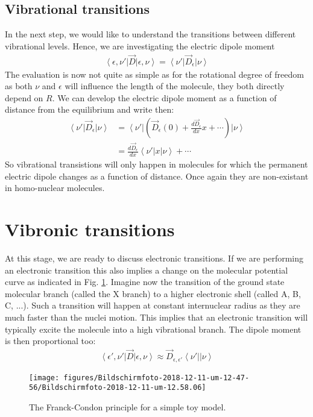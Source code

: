 \documentclass[10pt]{article}
\newcommand{\bra}[1]{\ensuremath{\left\langle#1\right|}}
\newcommand{\ket}[1]{\ensuremath{\left|#1\right\rangle}}
\begin{document}
\subsection{Vibrational transitions}
In the next step, we would like to understand the transitions between different vibrational levels. Hence, we are investigating the electric dipole moment 
\begin{align}
\bra{\epsilon, \nu'} \vec{D}\ket{\epsilon, \nu}= \bra{\nu'} \vec{D}_\epsilon\ket{\nu}
\end{align}
The evaluation is now not quite as simple as for the rotational degree of freedom as both $\nu$ and $\epsilon$ will influence the length of the molecule, they both directly depend on $R$. We can develop the electric dipole moment as a function of distance from the equilibrium and write then:
\begin{align}
\bra{\nu'} \vec{D}_\epsilon\ket{\nu}&= \bra{\nu'} \left(\vec{D}_\epsilon(0)+ \frac{d\vec{D}_\epsilon}{dx}x+\cdots\right)\ket{\nu}\\
&= \frac{d\vec{D}_\epsilon}{dx}\bra{\nu'}x\ket{\nu}+\cdots
\end{align}
So vibrational transistions will only happen in molecules for which the permanent electric dipole changes as a function of distance. Once again they are non-existant in homo-nuclear molecules.

\section{Vibronic transitions}

At this stage, we are ready to discuss electronic transitions. If we are performing an electronic transition this also implies a change on the molecular potential curve as indicated in Fig. \ref{121419}. Imagine now the transition of the ground state molecular branch (called the X branch) to a higher electronic shell (called A, B, C, ...). Such a transition will happen at constant internuclear radius as they are much faster than the nuclei motion. This implies that an electronic transition will typically excite the molecule into a high vibrational branch. The dipole moment is then proportional too:
\begin{align}
\bra{\epsilon', \nu'} \vec{D}\ket{\epsilon, \nu}\approx \vec{D}_{\epsilon, \epsilon'} \bra{\nu'} \ket{\nu}
\end{align}
\begin{figure}[h!]
\begin{center}
\texttt{[image: figures/Bildschirmfoto-2018-12-11-um-12-47-56/Bildschirmfoto-2018-12-11-um-12.58.06]}
\caption{{The Franck-Condon principle for a simple toy model.
{\label{121419}}%
}}
\end{center}
\end{figure}
\end{document}
